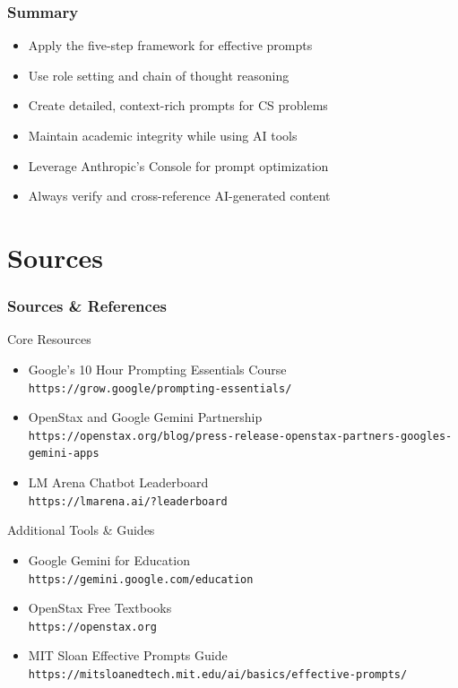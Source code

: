 \documentclass{beamer}
\begin{document}
\begin{frame}
\frametitle{Summary}
\begin{itemize}
\item Apply the five-step framework for effective prompts
\item Use role setting and chain of thought reasoning
\item Create detailed, context-rich prompts for CS problems
\item Maintain academic integrity while using AI tools
\item Leverage Anthropic's Console for prompt optimization
\item Always verify and cross-reference AI-generated content
\end{itemize}
\end{frame}

\section{Sources}
\frame{\sectionpage}

\begin{frame}[allowframebreaks]
\frametitle{Sources \& References}

\begin{block}{Core Resources}
\begin{itemize}
\item Google's 10 Hour Prompting Essentials Course\\
    \texttt{https://grow.google/prompting-essentials/}
\item OpenStax and Google Gemini Partnership\\
    \texttt{https://openstax.org/blog/press-release-openstax-partners-googles-gemini-apps}
\item LM Arena Chatbot Leaderboard\\
    \texttt{https://lmarena.ai/?leaderboard}
\end{itemize}
\end{block}

\begin{block}{Additional Tools \& Guides}
\begin{itemize}
\item Google Gemini for Education\\
    \texttt{https://gemini.google.com/education}
\item OpenStax Free Textbooks\\
    \texttt{https://openstax.org}
\item MIT Sloan Effective Prompts Guide\\
    \texttt{https://mitsloanedtech.mit.edu/ai/basics/effective-prompts/}
\end{itemize}
\end{block}
\end{frame}
\end{document}
